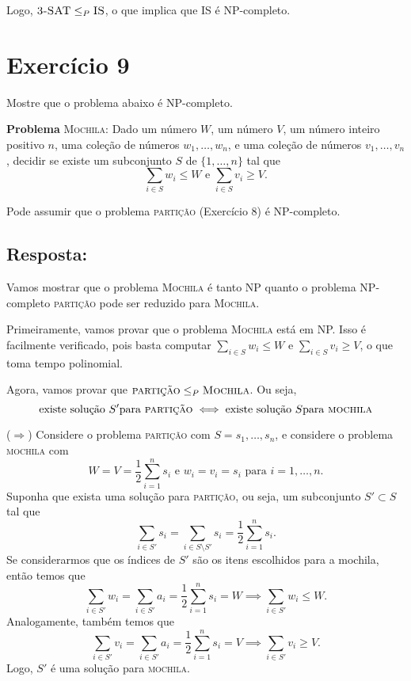 \documentclass{article}
\begin{document}
\bigskip

Logo, $\textsc{3-SAT} \leq_P \textsc{IS}$, o que implica que \textsc{IS} é NP-completo.

\newpage

\section*{Exercício 9}
Mostre que o problema abaixo é NP-completo.
\begin{center}
  \begin{minipage}{33em}
    \textbf{Problema} \textsc{Mochila:} Dado um número $W$, um número $V$, um número inteiro positivo $n$, uma coleção de números $w_1, \dots, w_n$, e uma coleção de números $v_1, \dots, v_n$, decidir se existe um subconjunto $S$ de $\{1, \dots, n\}$ tal que
    \[\sum_{i \in S}w_i \leq W \mbox{ e } \sum_{i \in S}v_i \geq V .\]
  \end{minipage}
\end{center}
Pode assumir que o problema \textsc{partição} (Exercício 8) é NP-completo.

\bigskip

\subsection*{Resposta:}
Vamos mostrar que o problema \textsc{Mochila} é tanto NP quanto o problema NP-completo \textsc{partição} pode ser reduzido para \textsc{Mochila}.

\bigskip

Primeiramente, vamos provar que o problema \textsc{Mochila} está em NP.
Isso é facilmente verificado, pois basta computar $\sum_{i \in S}w_i \leq W$ e $\sum_{i \in S}v_i \geq V$, o que toma tempo polinomial.

\bigskip

Agora, vamos provar que $\textsc{partição} \leq_P \textsc{Mochila}$. Ou seja,
\[ \mbox{existe solução } S' \mbox{para \textsc{partição}} \iff \mbox{existe solução } S \mbox{para \textsc{mochila}}\]

($\Rightarrow$) Considere o problema \textsc{partição} com $S = s_1, \dots, s_n$, e considere o problema \textsc{mochila} com
\[ W = V = \frac{1}{2}\sum_{i=1}^n s_i \mbox{ e } w_i = v_i = s_i \mbox{ para } i=1, \dots, n . \]
Suponha que exista uma solução para \textsc{partição}, ou seja, um subconjunto $S' \subset S$ tal que
\[ \sum_{i \in S'}s_i = \sum_{i \in S \setminus S'}s_i = \frac{1}{2}\sum_{i=1}^n s_i .\]
Se considerarmos que os índices de $S'$ são os itens escolhidos para a mochila, então temos que
\[ \sum_{i \in S'}w_i = \sum_{i \in S'}a_i = \frac{1}{2}\sum_{i=1}^n s_i = W \implies \sum_{i \in S'}w_i \leq W . \]
Analogamente, também temos que
\[ \sum_{i \in S'}v_i = \sum_{i \in S'}a_i = \frac{1}{2}\sum_{i=1}^n s_i = V \implies \sum_{i \in S'}v_i \geq V . \]
Logo, $S'$ é uma solução para \textsc{mochila}.
\end{document}
